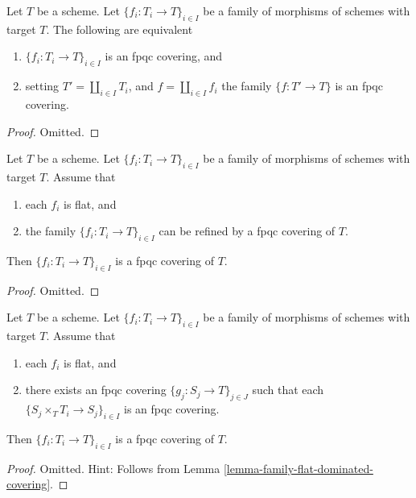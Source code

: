 \begin{lemma}
\label{lemma-disjoint-union-is-fpqc-covering}
Let $T$ be a scheme. Let $\{f_i : T_i \to T\}_{i \in I}$ be a family of
morphisms of schemes with target $T$. The following are equivalent
\begin{enumerate}
\item $\{f_i : T_i \to T\}_{i \in I}$ is an fpqc covering, and
\item setting $T' = \coprod_{i \in I} T_i$, and $f = \coprod_{i \in I} f_i$
the family $\{f : T' \to T\}$ is an fpqc covering.
\end{enumerate}
\end{lemma}

\begin{proof}
Omitted.
\end{proof}

\begin{lemma}
\label{lemma-family-flat-dominated-covering}
Let $T$ be a scheme. Let $\{f_i : T_i \to T\}_{i \in I}$ be a family of
morphisms of schemes with target $T$. Assume that
\begin{enumerate}
\item each $f_i$ is flat, and
\item the family $\{f_i : T_i \to T\}_{i \in I}$ can be refined by a
fpqc covering of $T$.
\end{enumerate}
Then $\{f_i : T_i \to T\}_{i \in I}$ is a fpqc covering of $T$.
\end{lemma}

\begin{proof}
Omitted.
\end{proof}

\begin{lemma}
\label{lemma-family-flat-fpqc-local-covering}
Let $T$ be a scheme. Let $\{f_i : T_i \to T\}_{i \in I}$ be a family of
morphisms of schemes with target $T$. Assume that
\begin{enumerate}
\item each $f_i$ is flat, and
\item there exists an fpqc covering
$\{g_j : S_j \to T\}_{j \in J}$ such that each
$\{S_j \times_T T_i \to S_j\}_{i \in I}$ is an fpqc covering.
\end{enumerate}
Then $\{f_i : T_i \to T\}_{i \in I}$ is a fpqc covering of $T$.
\end{lemma}

\begin{proof}
Omitted. Hint: Follows from Lemma \ref{lemma-family-flat-dominated-covering}.
\end{proof}

